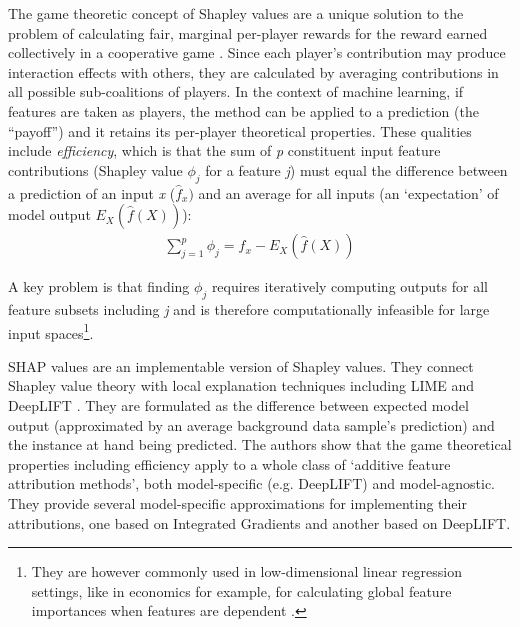 \documentclass[main]{subfiles}
\begin{document}
The game theoretic concept of Shapley values are a unique solution to the problem of calculating fair, marginal per-player rewards for the reward earned collectively in a cooperative game \cite{shapley}. Since each player's contribution may produce interaction effects with others, they are calculated by averaging contributions in all possible sub-coalitions of players. In the context of machine learning, if features are taken as players, the method can be applied to a prediction (the ``payoff'') and it retains its per-player theoretical properties. These qualities include \textit{efficiency}, which is that the sum of \textit{p} constituent input feature contributions (Shapley value $\phi_{j}$ for a feature \textit{j}) must equal the difference between a prediction of an input \textit{x} ($\widehat{f}_{x})$ and an average for all inputs (an `expectation' of model output $E_X(\widehat{f}(X))$):
\begin{align}
\sum_{j=1}^{p}\phi_{j} = \widehat{f}_{x} - E_X(\widehat{f}(X))
\end{align}

A key problem is that finding $\phi_{j}$ requires iteratively computing outputs for all feature subsets including \textit{j} and is therefore computationally infeasible for large input spaces\footnote{They are however commonly used in low-dimensional linear regression settings, like in economics for example, for calculating global feature importances when features are dependent \cite{shapley}.}.

SHAP values are an implementable version of Shapley values. They connect Shapley value theory with local explanation techniques including LIME and DeepLIFT \cite{shap}.  They are formulated as the difference between expected model output (approximated by an average background data sample's prediction) and the instance at hand being predicted. The authors show that the game theoretical properties including efficiency apply to a whole class of `additive feature attribution methods', both model-specific (e.g. DeepLIFT) and model-agnostic. They provide several model-specific approximations for implementing their attributions, one based on Integrated Gradients and another based on DeepLIFT.

 
 
\end{document}
